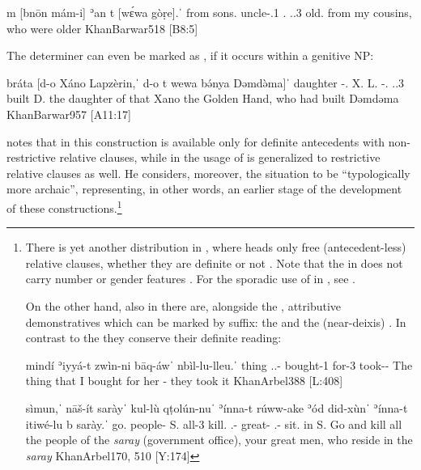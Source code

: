 {m\cb{} [bnōn\cb{} mám-i] ʾan\cb{} t\cb{} [wɛ́wa gòṛe].ˈ}
{from\cb{} sons.\cst\cb{} uncle-\poss.1\sg{} .\pl\cb{} \lnk\cb{} \cop.\pst.3\pl{} old.\pl{}}
{from my cousins, who were older}
{KhanBarwar}{518 {[B8:5]}}

The \Barw determiner can even be marked as \gen*, if it occurs within a genitive NP:

{bráta [d-o\cb{} Xáno Lapzèrin,ˈ d-o\cb{} t\cb{} wewa bə́nya Dəmdə̀ma]ˈ}
{daughter \gen-.\masc{} X. L. \gen-.\masc\cb{} \lnk\cb{} \cop.\pst.3\masc{} built D.}
{the daughter of that Xano the Golden Hand, who had built Dəmdəma}
{KhanBarwar}{957 {[A11:17]}}

\citet[83f.]{KhanGenitive} notes that in \Barw this construction is available only for definite antecedents with non-restrictive relative clauses, while in \Arb the usage of  is generalized to restrictive relative clauses as well. He considers, moreover, the \Barw situation to be \enquote{typologically more archaic}, representing, in other words, an earlier stage of the development of these constructions.\footnote{There is yet another distribution in \JSul, where  heads only free (antecedent-less) relative clauses, whether they are definite or not \citep[418]{KhanSulemaniyya}. Note that the \dem* {} in \JSul does not carry  number or gender features \citep[77]{KhanSulemaniyya}. For the sporadic use of  in \JUrm, see .

On the other hand, also in \Arb there are, alongside the \lnk* {}, attributive demonstratives which can be marked by \cst* suffix: the \pl* \dem* {} and the \sg* (near-deixis) \dem* {}. In contrast to the \lnk* they conserve their definite reading:

{mindí ʾiyyá-t zwìn-ni bāq-áwˈ nbìl-lu-lleu.ˈ}
{thing \dem.\sg.\near-\cst{} bought-1\sg{} for-3\fem{} took-\pl-\masc}
{The thing that I bought for her - they took it}
{KhanArbel}{388 {[L:408]}}

{sìmun,ˈ nāš-ít saràyˈ kul-lù qṭolún-nuˈ ʾínna-t rúww-ake ʾód did-xùnˈ ʾínna-t itiwé-lu b\cb{} sarày.ˈ}
{go.\imp{} people-\cst{} S. all-3\pl{} kill.\pl{} \dem.\pl-\cst{} great- \lnk{} \pl{} \dem.\pl-\cst{} sit.\pl{} in\cb{} S.}
{Go and kill all the people of the \textit{saray} (government office), your great men, who reside in the \textit{saray}}
{KhanArbel}{170, 510 {[Y:174]}}

}
